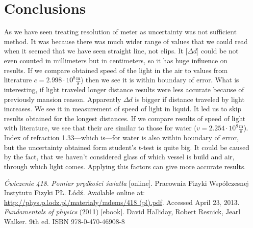\documentclass[a4paper,12pt]{article}
\begin{document}
    \section{Conclusions}
    As we have seen treating resolution of meter as uncertainty was not sufficient method. It was because there was much wider range of values that we could read when it seemed that we have seen straight line, not elips. It [$\Delta d$] could be not even counted in millimeters but in centimeters, so it has huge influence on results. If we compare obtained speed of the light in the air to values from literature $c = 2.998 \cdot 10^8 \frac{\mathrm m}{\mathrm s}$) then we see it is within boundary of error. What is interesting, if light traveled longer distance results were less accurate because of previously mansion reason. Apparently $\Delta d$ is bigger if distance traveled by light increases. We see it in measurement of speed of light in liquid. It led us to skip results obtained for the longest distances. If we compare results of speed of light with literature, we see that their are similar to those for water ($v = 2.254 \cdot 10^8 \frac{\mathrm m}{\mathrm s}$). Index of refraction 1.33---which is---for water is also within boundary of error, but the uncertainty obtained form student's $t$-test is quite big.  It could be caused by the fact, that we haven't considered glass of which vessel is build and air, through which light comes. Applying this factors can give more accurate results.     

    

    \begin{thebibliography}{9}
        \emph{Ćwiczenie 418. Pomiar prędkości światła} [online]. Pracownia Fizyki Współczesnej Instytutu Fizyki PŁ. Łódź. Available online at: \url{http://phys.p.lodz.pl/materialy/mdems/418 (pl).pdf}. Accessed April 23, 2013.
        \emph{Fundamentals of physics} (2011) [ebook]. David Halliday, Robert Resnick, Jearl Walker. 9th ed. ISBN 978-0-470-46908-8
    \end{thebibliography}
\end{document}
